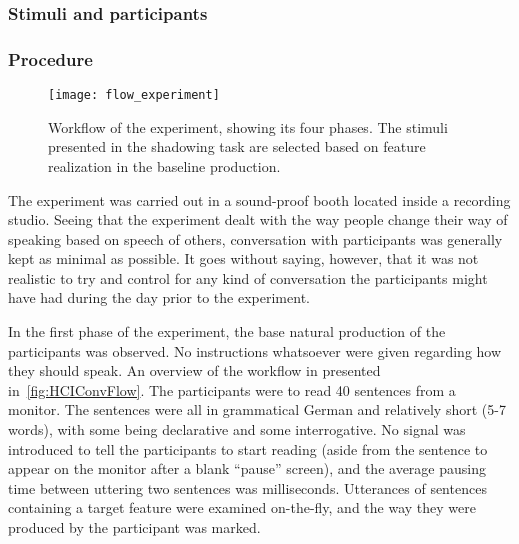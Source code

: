 

\subsubsection{Stimuli and participants}
\label{subsubsection:stimuli_participant_hci}


\subsubsection{Procedure}
\label{subsubsec:procedure_hci}

\begin{figure}[!t]
	\centering
	\texttt{[image: flow\_experiment]}
	\caption[\acs{hci} convergence experiment workflow]{Workflow of the experiment, showing its four phases. The stimuli presented in the shadowing task are selected based on feature realization in the baseline production.}
	\label{fig:HCIConvFlow}
\end{figure}

The experiment was carried out in a sound-proof booth located inside a recording studio.
Seeing that the experiment dealt with the way people change their way of speaking based on speech of others, conversation with participants was generally kept as minimal as possible.
It goes without saying, however, that it was not realistic to try and control for any kind of conversation the participants might have had during the day prior to the experiment.

In the first phase of the experiment, the base natural production of the participants was observed.
No instructions whatsoever were given regarding how they should speak.
An overview of the workflow in presented in~\autoref{fig:HCIConvFlow}.
The participants were to read 40 sentences from a monitor.
The sentences were all in grammatical German and relatively short (5-7 words), with some being declarative and some interrogative.
No signal was introduced to tell the participants to start reading (aside from the sentence to appear on the monitor after a blank \enquote{pause} screen), and the average pausing time between uttering two sentences was
milliseconds.
Utterances of sentences containing a target feature were examined on-the-fly, and the way they were produced by the participant was marked.

